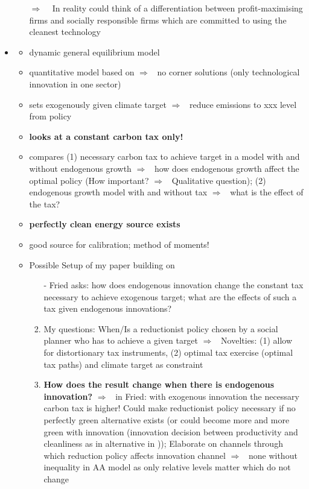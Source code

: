 \documentclass[12pt]{article}
\newcommand{\ar}{$\Rightarrow$ \ }
\begin{document}
\begin{itemize}
\begin{itemize}
	\item[\ar] In reality could think of a differentiation between profit-maximising firms and socially responsible firms which are committed to using the cleanest technology
\end{itemize}
\item \cite{Fried2018ClimateAnalysis}
\begin{itemize}
\item dynamic general equilibrium model
\item quantitative model based on \cite{Acemoglu2012TheChange} \ar no corner solutions (only technological innovation in one sector)
\item sets exogenously given climate target \ar reduce emissions to xxx level from policy
\item \textbf{looks at a constant carbon tax only!}
\item compares (1) necessary carbon tax to achieve target in a model with and without endogenous growth \ar how does endogenous growth affect the optimal policy (How important? \ar Qualitative question); (2) endogenous growth model with and without tax \ar what is the effect of the tax?
\item \textbf{perfectly clean energy source exists}
\item good source for calibration; method of moments!
\item Possible Setup of my paper building on \cite{Fried2018ClimateAnalysis}
\begin{enumerate}
\item[-] Fried asks: how does endogenous innovation change the constant tax necessary to achieve exogenous target; what are the effects of such a tax given endogenous innovations?
\item My questions: When/Is a reductionist policy chosen by a social planner who has to achieve a given target \ar Novelties: (1) allow for distortionary tax instruments, (2) optimal tax exercise (optimal tax paths) and climate target as constraint 
\item \textbf{How does the result change when there is endogenous innovation?} \ar in Fried: with exogenous innovation the necessary carbon tax is higher! Could make reductionist policy necessary if no perfectly green alternative exists (or could become more and more green with innovation (innovation decision between productivity and cleanliness as in alternative in \cite{Acemoglu2012TheChange})); Elaborate on channels through which reduction policy affects innovation channel \ar none without inequality in AA model as only relative levels matter which do not change

\end{enumerate}
\end{itemize}
\end{itemize}
\end{document}
